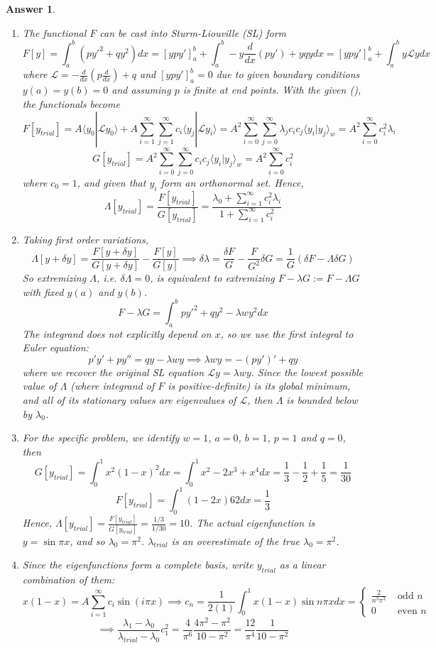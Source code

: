 \documentclass[a4paper]{article}
\newtheorem{ans}{Answer}[section]
\theoremstyle{new}
\begin{document}
\begin{ans}\leavevmode
\begin{enumerate}[label=(\alph*)]
\item The functional $F$ can be cast into Sturm-Liouville (SL) form 
$$F[y]=\int_a^b(py'^2+qy^2)dx=[ypy']_a^b+\int_a^b-y\frac{d}{dx}(py')+yqydx=[ypy']_a^b+\int_a^b y\mathcal{L}ydx$$
where $\mathcal{L}=-\frac{d}{dx}(p\frac{d}{dx})+q$ and $[ypy']_a^b=0$ due to given boundary conditions $y(a)=y(b)=0$ and assuming $p$ is finite at end points. With the given (\dag), the functionals become
$$F[y_{trial}]=A\langle y_0|\mathcal{L}y_0\rangle+A\sum_{i=1}^\infty\sum_{j=1}
^\infty c_i\langle y_j|\mathcal{L}y_i\rangle=A^2\sum_{i=0}^\infty\sum_{j=0}^\infty\lambda_jc_ic_j\langle y_i|y_j\rangle_w=A^2\sum_{i=0}^\infty c_i^2\lambda_i$$
$$G[y_{trial}]=A^2\sum_{i=0}^\infty\sum_{j=0}^\infty c_ic_j\langle y_i|y_j\rangle_w=A^2\sum_{i=0}^\infty c_i^2$$
where $c_0=1$, and given that $y_i$ form an orthonormal set. Hence,
$$\Lambda[y_{trial}]=\frac{F[y_{trial}]}{G[y_{trial}]}=\frac{\lambda_0+\sum_{i=1}^\infty c_i^2\lambda_i}{1+\sum_{i=1}^\infty c_i^2}$$
\item Taking first order variations,
$$\Lambda[y+\delta y]=\frac{F[y+\delta y]}{G[y+\delta y]}-\frac{F[y]}{G[y]}\implies \delta\lambda=\frac{\delta F}{G}-\frac{F}{G^2}\delta G
=\frac{1}{G}(\delta F-\Lambda\delta G)$$
So extremizing $\Lambda$, i.e. $\delta\Lambda=0$, is equivalent to extremizing $F-\lambda G:=F-\Lambda G$ with fixed $y(a)$ and $y(b)$.
$$F-\lambda G=\int_a^bpy'^2+qy^2-\lambda wy^2dx$$
The integrand does not explicitly depend on $x$, so we use the first integral to Euler equation:
$$p'y'+py''=qy-\lambda wy\implies \lambda wy=-(py')'+qy$$
where we recover the original SL equation $\mathcal{L}y=\lambda wy$. Since the lowest possible value of $\Lambda$ (where integrand of $F$ is positive-definite) is its global minimum, and all of its stationary values are eigenvalues of $\mathcal{L}$, then $\Lambda$ is bounded below by $\lambda_0$.
\item For the specific problem, we identify $w=1$, $a=0$, $b=1$, $p=1$ and $q=0$, then
$$G[y_{trial}]=\int_0^1x^2(1-x)^2dx=\int_0^1x^2-2x^3+x^4dx=\frac{1}{3}-\frac{1}{2}+\frac{1}{5}=\frac{1}{30}$$
$$F[y_{trial}]=\int_0^1(1-2x)62dx=\frac{1}{3}$$
Hence, $\Lambda[y_{trial}]=\frac{F[y_{trial}]}{G[y_{trial}]}=\frac{1/3}{1/30}=10$. The actual eigenfunction is $y=\sin\pi x$, and so $\lambda_0=\pi^2$. $\lambda_{trial}$ is an overestimate of the true $\lambda_0=\pi^2$.
\item Since the eigenfunctions form a complete basis, write $y_{trial}$ as a linear combination of them:
$$x(1-x)=A\sum_{i=1}^\infty c_i\sin(i\pi x)\implies c_n=\frac{1}{2(1)}\int_0^1x(1-x)\sin n\pi xdx=\left\{
        \begin{array}{ll}
      \frac{2}{n^3\pi^3} & \text{ odd }n \\
      0 & \text{ even } n
        \end{array}
    \right.$$
$$\implies\frac{\lambda_1-\lambda_0}{\lambda_{trial}-\lambda_0}c_1^2=\frac{4}{\pi^6}\frac{4\pi^2-\pi^2}{10-\pi^2}=\frac{12}{\pi^4}\frac{1}{10-\pi^2}$$
\end{enumerate}
\end{ans}
\newpage
\end{document}
